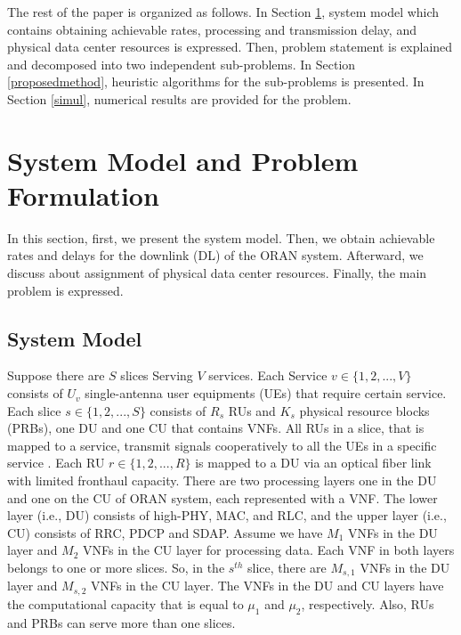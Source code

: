 \documentclass[conference]{IEEEtran}
\begin{document}
The rest of the paper is organized as follows. In Section \ref{systemmodel}, system model which contains obtaining achievable rates, processing and transmission delay, and physical data center resources is expressed. Then, problem statement is explained and decomposed into two independent sub-problems.
In Section \ref{proposedmethod}, heuristic algorithms for the sub-problems is presented. In Section \ref{simul}, numerical results are provided for the problem.


\section{System Model and Problem Formulation}\label{systemmodel}

In this section, first, we  present the system model. Then, we obtain achievable rates and delays for the downlink (DL) of the ORAN system. Afterward, we discuss about assignment of physical data center resources.
Finally, the main problem is expressed.
\subsection{System Model}
Suppose there are $S$ slices Serving $V$ services. Each Service $v\in \{1,2,...,V \} $ consists of $U_v$
single-antenna user equipments (UEs) that require certain service. Each slice $s \in \{1,2,...,S \}$ consists of $R_s$ RUs and $K_s$ physical resource blocks (PRBs), one DU and one CU that contains VNFs. All RUs in a slice, that is mapped to a service, transmit signals cooperatively to all the UEs in a specific service \cite{motalleb2017optimal,mimoCran}. Each RU $r \in \{1,2,...,R \}$ is mapped to a DU via an optical fiber link with limited fronthaul capacity.
There are two processing layers one in the DU and one on the CU of ORAN system, each represented with a VNF. The lower layer (i.e., DU) consists of high-PHY, MAC, and RLC, and the upper layer (i.e., CU) consists of RRC, PDCP and SDAP. Assume we have $M_1$ VNFs in the DU layer and $M_2$ VNFs in the CU layer for processing data.
Each VNF in both layers belongs to one or more slices. So, in the $s^{th}$ slice, there are $M_{s,1}$ VNFs in the DU layer and $M_{s,2}$ VNFs in the CU layer. The VNFs in the DU and CU layers have the computational capacity that is  equal to $\mu_1$ and $\mu_2$, respectively.
Also, RUs and PRBs can serve more than one slices.
\end{document}
